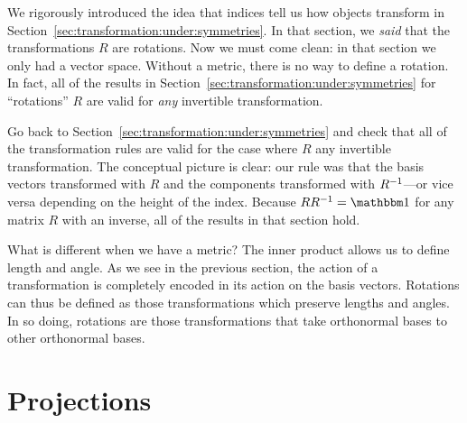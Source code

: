 \documentclass[12pt, oneside]{report}    %
\let\oldsection\section
\def\section{%
  \setcounter{sidenote}{1}%
  \oldsection
}
\begin{document}
We rigorously introduced the idea that indices tell us how objects transform in Section~\ref{sec:transformation:under:symmetries}. In that section, we \emph{said} that the transformations $R$ are rotations. Now we must come clean: in that section we only had a vector space. Without a metric, there is no way to define a rotation. In fact, all of the results in Section~\ref{sec:transformation:under:symmetries} for ``rotations'' $R$ are valid for \emph{any} invertible transformation.
\begin{exercise}
Go back to Section~\ref{sec:transformation:under:symmetries} and check that all of the transformation rules are valid for the case where $R$ any invertible transformation. The conceptual picture is clear: our rule was that the basis vectors transformed with $R$ and the components transformed with $R^{-1}$---or vice versa depending on the height of the index. Because $RR\inv = \one$ for any matrix $R$ with an inverse, all of the results in that section hold.
\end{exercise}

What is different when we have a metric? The inner product allows us to define length and angle. As we see in the previous section, the action of a transformation is completely encoded in its action on the basis vectors. Rotations can thus be defined as those transformations which preserve lengths and angles. In so doing, rotations are those transformations that take orthonormal bases to other orthonormal bases. 




\section{Projections}
\label{sec:projections}
\end{document}
